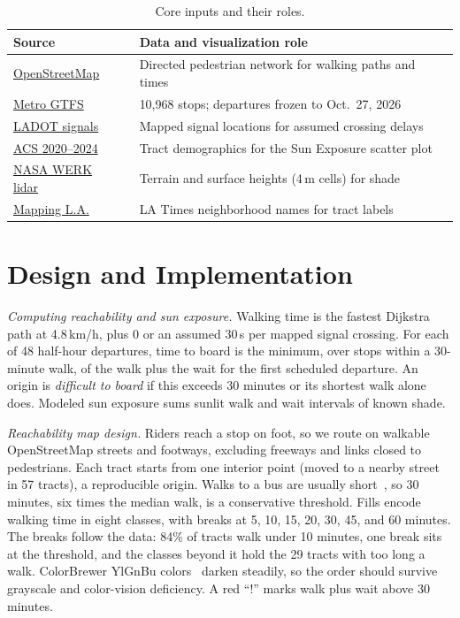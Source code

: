\documentclass[runningheads,a4paper]{llncs}
\begin{document}
\begin{table}[!htbp]
\caption{Core inputs and their roles.}\label{tab:data}
\centering
\footnotesize
\begin{tabular}{@{}p{.3\linewidth}p{.65\linewidth}@{}}
\toprule
Source & Data and visualization role \\
\midrule
\href{https://download.geofabrik.de/north-america/us/california/socal.html}{OpenStreetMap}~\cite{osm} & Directed pedestrian network for walking paths and times \\
\href{https://gitlab.com/LACMTA/gtfs_bus}{Metro GTFS}~\cite{metrogtfs} & 10,968 stops; departures frozen to Oct.\ 27, 2026 \\
\href{https://maps.lacity.org/lahub/rest/services/LADOT/MapServer/30}{LADOT signals}~\cite{ladotsignals} & Mapped signal locations for assumed crossing delays \\
\href{https://www.census.gov/programs-surveys/acs/data.html}{ACS 2020--2024}~\cite{census2024} & Tract demographics for the Sun Exposure scatter plot \\
\href{https://wifire-data.sdsc.edu/dataset/nasa-werk-dem-ca-losangeles-1-b23}{NASA WERK lidar}~\cite{werk} & Terrain and surface heights (4\,m cells) for shade \\
\href{https://services1.arcgis.com/tp9wqSVX1AitKgjd/arcgis/rest/services/VMT_2022_by_LA_Times_Neighborhood_WFL1/FeatureServer/0}{Mapping L.A.}~\cite{mappingla} & LA Times neighborhood names for tract labels \\
\bottomrule
\end{tabular}
\end{table}

\section{Design and Implementation}\label{sec:design}
\emph{Computing reachability and sun exposure.} Walking time is the fastest Dijkstra path at 4.8\,km/h, plus 0 or an assumed 30\,s per mapped signal crossing. For each of 48 half-hour departures, time to board is the minimum, over stops within a 30-minute walk, of the walk plus the wait for the first scheduled departure. An origin is \emph{difficult to board} if this exceeds 30 minutes or its shortest walk alone does. Modeled sun exposure sums sunlit walk and wait intervals of known shade.

\emph{Reachability map design.} Riders reach a stop on foot, so we route on walkable OpenStreetMap streets and footways, excluding freeways and links closed to pedestrians. Each tract starts from one interior point (moved to a nearby street in 57 tracts), a reproducible origin. Walks to a bus are usually short~\cite{elgeneidy2014}, so 30 minutes, six times the median walk, is a conservative threshold. Fills encode walking time in eight classes, with breaks at 5, 10, 15, 20, 30, 45, and 60 minutes. The breaks follow the data: 84\% of tracts walk under 10 minutes, one break sits at the threshold, and the classes beyond it hold the 29 tracts with too long a walk. ColorBrewer YlGnBu colors~\cite{harrower2003} darken steadily, so the order should survive grayscale and color-vision deficiency. A red ``!'' marks walk plus wait above 30 minutes.
\end{document}
